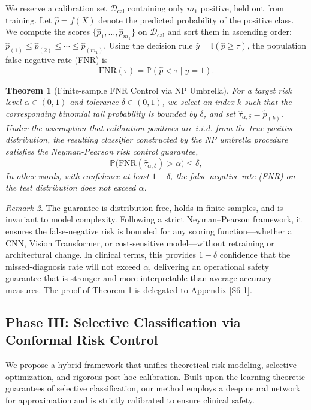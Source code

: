\documentclass[sigconf,review,anonymous]{acmart}
\newtheorem{theorem}{Theorem}[section]
\theoremstyle{remark}
\newtheorem{remark}[theorem]{Remark}
\begin{document}
We reserve a calibration set \(\mathcal{D}_{\mathrm{cal}}\) containing only \(m_{1}\) positive, held out from training.  
Let \(\hat{p} = f(X)\) denote the predicted probability of the positive class. We compute the scores \(\{\hat{p}_1,\dots,\hat{p}_{m_{1}}\}\) on \(\mathcal{D}_{\mathrm{cal}}\) and sort them in ascending order: \(\hat{p}_{(1)} \le \hat{p}_{(2)} \le \cdots \le \hat{p}_{(m_{1})}\).  
Using the decision rule \(\hat{y} = \mathbb{I}(\hat{p} \ge \tau)\), the population false‑negative rate (FNR) is  
\[
\mathrm{FNR}(\tau) = \mathbb{P}(\hat{p} < \tau \mid y=1).
\]

\begin{theorem}[Finite-sample FNR Control via NP Umbrella]\label{Th1}
For a target risk level $\alpha\in(0,1)$ and tolerance $\delta\in(0,1)$, we select an index $k$ such that the corresponding binomial tail probability is bounded by $\delta$, and set $\hat{\tau}_{\alpha,\delta} = \hat{p}_{(k)}$. Under the assumption that calibration positives are i.i.d. from the true positive distribution, the resulting classifier constructed by the NP umbrella procedure satisfies the Neyman-Pearson risk control guarantee,
\[
\mathbb{P}\bigl(\mathrm{FNR}(\hat{\tau}_{\alpha,\delta}) > \alpha\bigr)
\leq \delta,
\]
In other words, with confidence at least $1-\delta$, the false negative rate (FNR) on the test distribution does not exceed $\alpha$.
\end{theorem}

\begin{remark}
The guarantee is distribution-free, holds in finite samples, and is invariant to model complexity. Following a strict Neyman--Pearson framework, it ensures the false-negative risk is bounded for any scoring function---whether a CNN, Vision Transformer, or cost-sensitive model---without retraining or architectural change. In clinical terms, this provides $1-\delta$ confidence that the missed-diagnosis rate will not exceed $\alpha$, delivering an operational safety guarantee that is stronger and more interpretable than average-accuracy measures. The proof of Theorem \ref{Th1} is delegated to Appendix \ref{S6-1}.
\end{remark}


\subsection{Phase III: Selective Classification via Conformal Risk Control}\label{sec:phase3_method}

We propose a hybrid framework that unifies theoretical risk modeling, selective optimization, and rigorous post-hoc calibration. Built upon the learning-theoretic guarantees of selective classification, our method employs a deep neural network for approximation and is strictly calibrated to ensure clinical safety.
\end{document}
